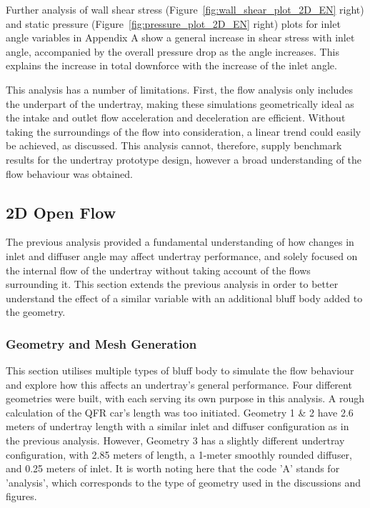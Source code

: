 \noindent Further analysis of wall shear stress (Figure~\ref{fig:wall_shear_plot_2D_EN} right) and static pressure (Figure~\ref{fig:pressure_plot_2D_EN} right) plots for inlet angle variables in Appendix A show a general increase in shear stress with inlet angle, accompanied by the overall pressure drop as the angle increases. This explains the increase in total downforce with the increase of the inlet angle.

\noindent This analysis has a number of limitations. First, the flow analysis only includes the underpart of the undertray, making these simulations geometrically ideal as the intake and outlet flow acceleration and deceleration are efficient. Without taking the surroundings of the flow into consideration, a linear trend could easily be achieved, as discussed. This analysis cannot, therefore, supply benchmark results for the undertray prototype design, however a broad understanding of the flow behaviour was obtained.



\subsection{2D Open Flow}
The previous analysis provided a fundamental understanding of how changes in inlet and diffuser angle may affect undertray performance, and solely focused on the internal flow of the undertray without taking account of the flows surrounding it. This section extends the previous analysis in order to better understand the effect of a similar variable with an additional bluff body added to the geometry. 

\subsubsection{Geometry and Mesh Generation}
This section utilises multiple types of bluff body to simulate the flow behaviour and explore how this affects an undertray's general performance. Four different geometries were built, with each serving its own purpose in this analysis. A rough calculation of the QFR car's length was too initiated. Geometry 1 \& 2 have 2.6 meters of undertray length with a similar inlet and diffuser configuration as in the previous analysis. However, Geometry 3 has a slightly different undertray configuration, with 2.85 meters of length, a 1-meter smoothly rounded diffuser, and 0.25 meters of inlet. It is worth noting here that the code 'A' stands for 'analysis', which corresponds to the type of geometry used in the discussions and figures.

